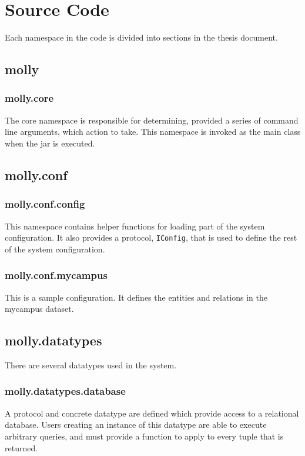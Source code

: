 	
\chapter{Source Code}
	Each namespace in the code is divided into sections in the thesis document.
	  
	\section{molly}
		\subsection{molly.core}
			The core namespace is responsible for determining, provided a series of command line arguments, which action to take.  This namespace is invoked as the main class when the \gls{jar} is executed.
			
	
	\clearpage
	\section{molly.conf}
		\subsection{molly.conf.config}
			This namespace contains helper functions for loading part of the system configuration.  It also provides a protocol, \texttt{IConfig}, that is used to define the rest of the system configuration.
			
		  
		\clearpage
		\subsection{molly.conf.mycampus}
			This is a sample configuration.  It defines the entities and relations in the mycampus dataset.
			
	
	\clearpage
	\section{molly.datatypes}
		There are several datatypes used in the system.
		\subsection{molly.datatypes.database}
			A protocol and concrete datatype are defined which provide access to a relational database.  Users creating an instance of this datatype are able to execute arbitrary queries, and must provide a function to apply to every tuple that is returned.
			

